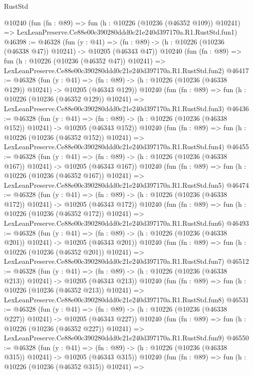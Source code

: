 \begin{lexlean}{RustStd}
\begin{coremodule}
    @10240
    (fun (fn : @89) =>
    fun (h : @10226 (@10236 (@46352 @109)) @10241) =>
    LexLeanPreserve.Ce88e00c390280ddd0c21e240d397170a.R1.RustStd.fun1)
@46398 := @46328
    (fun (y : @41) =>
    (fn : @89) -> (h : @10226 (@10236 (@46338 @47)) @10241) -> @10205 (@46343 @47))
    @10240
    (fun (fn : @89) =>
    fun (h : @10226 (@10236 (@46352 @47)) @10241) =>
    LexLeanPreserve.Ce88e00c390280ddd0c21e240d397170a.R1.RustStd.fun2)
@46417 := @46328
    (fun (y : @41) =>
    (fn : @89) -> (h : @10226 (@10236 (@46338 @129)) @10241) -> @10205 (@46343 @129))
    @10240
    (fun (fn : @89) =>
    fun (h : @10226 (@10236 (@46352 @129)) @10241) =>
    LexLeanPreserve.Ce88e00c390280ddd0c21e240d397170a.R1.RustStd.fun3)
@46436 := @46328
    (fun (y : @41) =>
    (fn : @89) -> (h : @10226 (@10236 (@46338 @152)) @10241) -> @10205 (@46343 @152))
    @10240
    (fun (fn : @89) =>
    fun (h : @10226 (@10236 (@46352 @152)) @10241) =>
    LexLeanPreserve.Ce88e00c390280ddd0c21e240d397170a.R1.RustStd.fun4)
@46455 := @46328
    (fun (y : @41) =>
    (fn : @89) -> (h : @10226 (@10236 (@46338 @167)) @10241) -> @10205 (@46343 @167))
    @10240
    (fun (fn : @89) =>
    fun (h : @10226 (@10236 (@46352 @167)) @10241) =>
    LexLeanPreserve.Ce88e00c390280ddd0c21e240d397170a.R1.RustStd.fun5)
@46474 := @46328
    (fun (y : @41) =>
    (fn : @89) -> (h : @10226 (@10236 (@46338 @172)) @10241) -> @10205 (@46343 @172))
    @10240
    (fun (fn : @89) =>
    fun (h : @10226 (@10236 (@46352 @172)) @10241) =>
    LexLeanPreserve.Ce88e00c390280ddd0c21e240d397170a.R1.RustStd.fun6)
@46493 := @46328
    (fun (y : @41) =>
    (fn : @89) -> (h : @10226 (@10236 (@46338 @201)) @10241) -> @10205 (@46343 @201))
    @10240
    (fun (fn : @89) =>
    fun (h : @10226 (@10236 (@46352 @201)) @10241) =>
    LexLeanPreserve.Ce88e00c390280ddd0c21e240d397170a.R1.RustStd.fun7)
@46512 := @46328
    (fun (y : @41) =>
    (fn : @89) -> (h : @10226 (@10236 (@46338 @213)) @10241) -> @10205 (@46343 @213))
    @10240
    (fun (fn : @89) =>
    fun (h : @10226 (@10236 (@46352 @213)) @10241) =>
    LexLeanPreserve.Ce88e00c390280ddd0c21e240d397170a.R1.RustStd.fun8)
@46531 := @46328
    (fun (y : @41) =>
    (fn : @89) -> (h : @10226 (@10236 (@46338 @227)) @10241) -> @10205 (@46343 @227))
    @10240
    (fun (fn : @89) =>
    fun (h : @10226 (@10236 (@46352 @227)) @10241) =>
    LexLeanPreserve.Ce88e00c390280ddd0c21e240d397170a.R1.RustStd.fun9)
@46550 := @46328
    (fun (y : @41) =>
    (fn : @89) -> (h : @10226 (@10236 (@46338 @315)) @10241) -> @10205 (@46343 @315))
    @10240
    (fun (fn : @89) =>
    fun (h : @10226 (@10236 (@46352 @315)) @10241) =>

\end{coremodule}
\end{lexlean}

